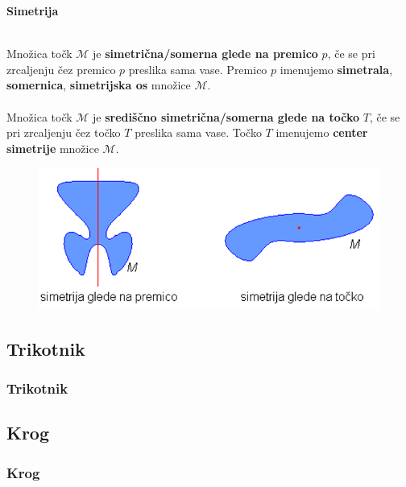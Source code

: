         \begin{frame}
            \large\textbf{Simetrija}
            ~\\
            ~\\
            \normalsize

            Množica točk $\mathcal{M}$ je \textbf{simetrična/somerna glede na premico} $p$, če se pri zrcaljenju čez premico $p$ preslika sama vase. Premico $p$ imenujemo \textbf{simetrala}, \textbf{somernica}, \textbf{simetrijska os} množice $\mathcal{M}$. \\
            ~\\
            
            Množica točk $\mathcal{M}$ je \textbf{središčno simetrična/somerna glede na točko} $T$, če se pri zrcaljenju čez točko $T$ preslika sama vase. Točko $T$ imenujemo \textbf{center simetrije} množice $\mathcal{M}$. 
            \begin{figure}
                \includegraphics[scale=0.45]{Slike in skice/Simetrija.png}
            \end{figure}

        \end{frame}

    \subsection{Trikotnik}

        \begin{frame}
            \frametitle{Trikotnik}


        \end{frame}

    \subsection{Krog}

        \begin{frame}
            \frametitle{Krog}
        \end{frame}

